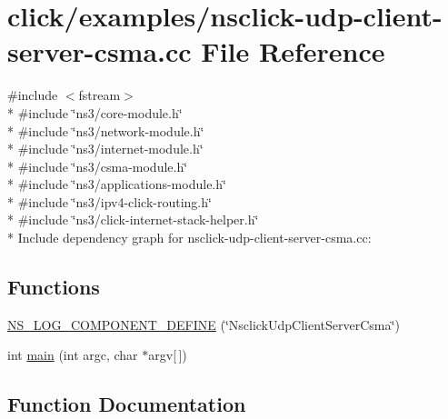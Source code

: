 \hypertarget{nsclick-udp-client-server-csma_8cc}{}\section{click/examples/nsclick-\/udp-\/client-\/server-\/csma.cc File Reference}
\label{nsclick-udp-client-server-csma_8cc}
{\ttfamily \#include $<$fstream$>$}\\*
{\ttfamily \#include \char`\"{}ns3/core-\/module.\+h\char`\"{}}\\*
{\ttfamily \#include \char`\"{}ns3/network-\/module.\+h\char`\"{}}\\*
{\ttfamily \#include \char`\"{}ns3/internet-\/module.\+h\char`\"{}}\\*
{\ttfamily \#include \char`\"{}ns3/csma-\/module.\+h\char`\"{}}\\*
{\ttfamily \#include \char`\"{}ns3/applications-\/module.\+h\char`\"{}}\\*
{\ttfamily \#include \char`\"{}ns3/ipv4-\/click-\/routing.\+h\char`\"{}}\\*
{\ttfamily \#include \char`\"{}ns3/click-\/internet-\/stack-\/helper.\+h\char`\"{}}\\*
Include dependency graph for nsclick-\/udp-\/client-\/server-\/csma.cc\+:
\subsection*{Functions}
\begin{DoxyCompactItemize}
\item 
\hyperlink{nsclick-udp-client-server-csma_8cc_a5d9691a735b079c73fd01596a7311482}{N\+S\+\_\+\+L\+O\+G\+\_\+\+C\+O\+M\+P\+O\+N\+E\+N\+T\+\_\+\+D\+E\+F\+I\+NE} (\char`\"{}Nsclick\+Udp\+Client\+Server\+Csma\char`\"{})
\item 
int \hyperlink{nsclick-udp-client-server-csma_8cc_a0ddf1224851353fc92bfbff6f499fa97}{main} (int argc, char $\ast$argv\mbox{[}$\,$\mbox{]})
\end{DoxyCompactItemize}


\subsection{Function Documentation}
